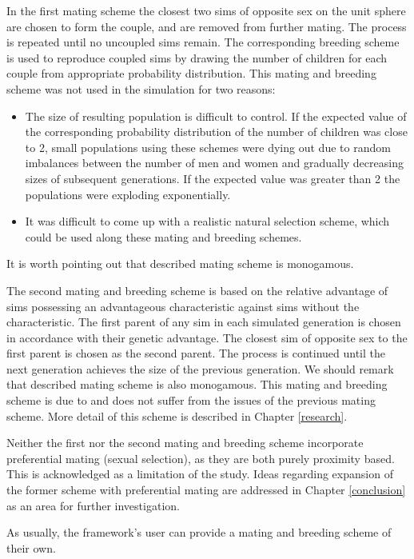 \documentclass{l4proj}
\begin{document}
In the first mating scheme the closest two sims of opposite sex on the unit sphere are chosen to form the couple, and are removed from further mating. The process is repeated until no uncoupled sims remain. The corresponding breeding scheme is used to reproduce coupled sims by drawing the number of children for each couple from appropriate probability distribution. This mating and breeding scheme was not used in the simulation for two reasons:
\begin{itemize}
\item The size of resulting population is difficult to control. If the expected value of the corresponding probability distribution of the number of children was close to 2, small populations using these schemes were dying out due to random imbalances between the number of men and women and gradually decreasing sizes of subsequent generations. If the expected value was greater than 2 the populations were exploding exponentially.
\item It was difficult to come up with a realistic natural selection scheme, which could be used along these mating and breeding schemes.
\end{itemize}
It is worth pointing out that described mating scheme is monogamous.

The second mating and breeding scheme is based on the relative advantage of sims possessing an advantageous characteristic against sims without the characteristic. The first parent of any sim in each simulated generation is chosen in accordance with their genetic advantage. The closest sim of opposite sex to the first parent is chosen as the second parent. The process is continued until the next generation achieves the size of the previous generation. We should remark that described mating scheme is also monogamous. This mating and breeding scheme is due to \textcite{peng10} and does not suffer from the issues of the previous mating scheme. More detail of this scheme is described in Chapter \ref{research}.

Neither the first nor the second mating and breeding scheme incorporate preferential mating (sexual selection), as they are both purely proximity based. This is acknowledged as a limitation of the study. Ideas regarding expansion of the former scheme with preferential mating are addressed in Chapter \ref{conclusion} as an area for further investigation.

As usually, the framework's user can provide a mating and breeding scheme of their own.
\end{document}
